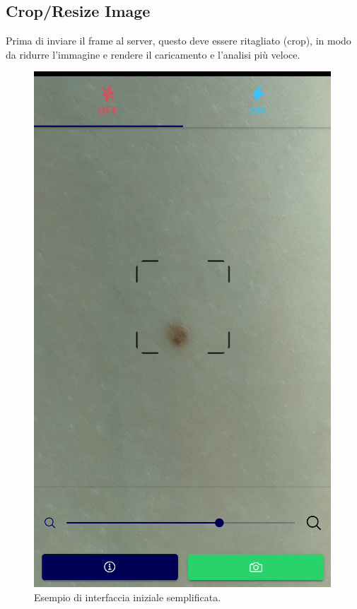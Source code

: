 {\subsection{Crop/Resize Image}
Prima di inviare il frame al server, questo deve essere ritagliato (crop), in modo da ridurre l'immagine e rendere il caricamento e l'analisi più veloce.
\begin{figure}[h]
	\begin{center}
		\includegraphics[scale=0.7]{figure/capitolo4/interface.png}
	\end{center}
	\caption{Esempio di interfaccia iniziale semplificata.}	
\end{figure}
\newpage
}
